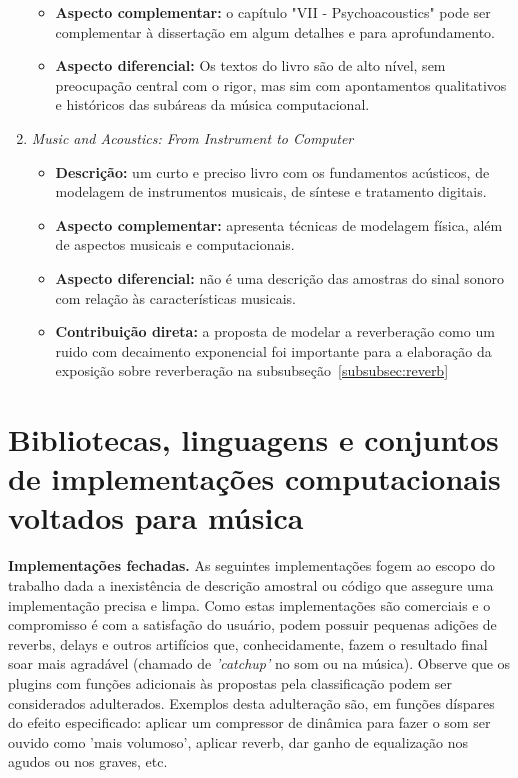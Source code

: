 \begin{enumerate}
\begin{itemize}
            \item {\bf Aspecto complementar:} o capítulo "VII - Psychoacoustics" pode ser complementar à dissertação em algum detalhes e para aprofundamento.
            \item {\bf Aspecto diferencial:} Os textos do livro são de alto nível, sem preocupação central com o rigor, mas sim com apontamentos qualitativos e históricos das subáreas da música computacional. 
        \end{itemize}
    \item \emph{Music and Acoustics: From Instrument to Computer}
        \begin{itemize}
            \item {\bf Descrição:} um curto e preciso livro com os fundamentos acústicos, de modelagem de instrumentos musicais, de síntese e tratamento digitais.
            \item {\bf Aspecto complementar:} apresenta técnicas de modelagem física, além de aspectos musicais e computacionais.
            \item {\bf Aspecto diferencial:} não é uma descrição das amostras do sinal sonoro com relação às características musicais.
            \item {\bf Contribuição direta:} a proposta de modelar a reverberação como um ruido com decaimento exponencial foi importante para a elaboração da exposição sobre reverberação na subsubseção~\ref{subsubsec:reverb}
        \end{itemize}
\end{enumerate}

\section{Bibliotecas, linguagens e conjuntos de implementações computacionais voltados para música}\label{subsec:bibs}
{\bf Implementações fechadas.} As seguintes implementações fogem ao escopo do trabalho dada a inexistência de descrição amostral ou código que assegure uma implementação precisa e limpa. Como estas implementações são comerciais e o compromisso é com a satisfação do usuário, podem possuir pequenas adições de reverbs, delays e outros artifícios que, conhecidamente, fazem o resultado final soar mais agradável (chamado de \emph{'catchup'} no som ou na música). Observe que os plugins com funções adicionais às propostas pela classificação podem ser considerados adulterados. Exemplos desta adulteração são, em funções díspares do efeito especificado: aplicar um compressor de dinâmica para fazer o som ser ouvido como 'mais volumoso', aplicar reverb, dar ganho de equalização nos agudos ou nos graves, etc. 

